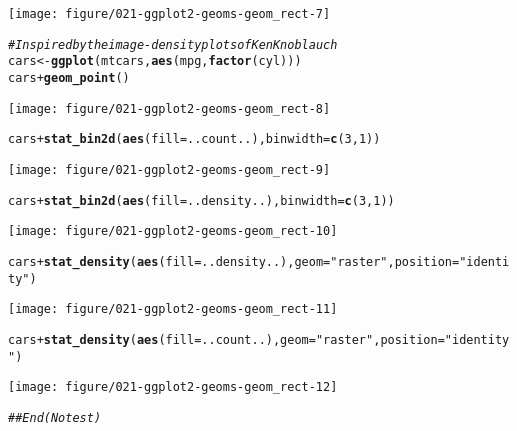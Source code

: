 \documentclass[a4paper,titlepage]{tufte-handout}\usepackage[]{graphicx}\usepackage[]{color}
\makeatletter
\def\maxwidth{ %
  \ifdim\Gin@nat@width>\linewidth
    \linewidth
  \else
    \Gin@nat@width
  \fi
}
\newcommand{\hlnum}[1]{\textcolor[rgb]{0.686,0.059,0.569}{#1}}%
\newcommand{\hlstr}[1]{\textcolor[rgb]{0.192,0.494,0.8}{#1}}%
\newcommand{\hlcom}[1]{\textcolor[rgb]{0.678,0.584,0.686}{\textit{#1}}}%
\newcommand{\hlopt}[1]{\textcolor[rgb]{0,0,0}{#1}}%
\newcommand{\hlstd}[1]{\textcolor[rgb]{0.345,0.345,0.345}{#1}}%
\newcommand{\hlkwb}[1]{\textcolor[rgb]{0.69,0.353,0.396}{#1}}%
\newcommand{\hlkwc}[1]{\textcolor[rgb]{0.333,0.667,0.333}{#1}}%
\newcommand{\hlkwd}[1]{\textcolor[rgb]{0.737,0.353,0.396}{\textbf{#1}}}%
\newenvironment{kframe}{%
 \def\at@end@of@kframe{}%
 \ifinner\ifhmode%
  \def\at@end@of@kframe{\end{minipage}}%
  \begin{minipage}{\columnwidth}%
 \fi\fi%
 \def\FrameCommand##1{\hskip\@totalleftmargin \hskip-\fboxsep
 \colorbox{shadecolor}{##1}\hskip-\fboxsep
     \hskip-\linewidth \hskip-\@totalleftmargin \hskip\columnwidth}%
 \MakeFramed {\advance\hsize-\width
   \@totalleftmargin\z@ \linewidth\hsize
   \@setminipage}}%
 {\par\unskip\endMakeFramed%
 \at@end@of@kframe}
\newenvironment{knitrout}{}{} %
\makeatother
\begin{document}
\begin{knitrout}
\begin{kframe}
\begin{alltt}
\end{alltt}
\end{kframe}
\texttt{[image: figure/021-ggplot2-geoms-geom\_rect-7]} 
\begin{kframe}\begin{alltt}
\hlcom{# Inspired by the image-density plots of Ken Knoblauch}
\hlstd{cars} \hlkwb{<-} \hlkwd{ggplot}\hlstd{(mtcars,} \hlkwd{aes}\hlstd{(mpg,} \hlkwd{factor}\hlstd{(cyl)))}
\hlstd{cars} \hlopt{+} \hlkwd{geom_point}\hlstd{()}
\end{alltt}
\end{kframe}
\texttt{[image: figure/021-ggplot2-geoms-geom\_rect-8]} 
\begin{kframe}\begin{alltt}
\hlstd{cars} \hlopt{+} \hlkwd{stat_bin2d}\hlstd{(}\hlkwd{aes}\hlstd{(}\hlkwc{fill} \hlstd{= ..count..),} \hlkwc{binwidth} \hlstd{=} \hlkwd{c}\hlstd{(}\hlnum{3}\hlstd{,}\hlnum{1}\hlstd{))}
\end{alltt}
\end{kframe}
\texttt{[image: figure/021-ggplot2-geoms-geom\_rect-9]} 
\begin{kframe}\begin{alltt}
\hlstd{cars} \hlopt{+} \hlkwd{stat_bin2d}\hlstd{(}\hlkwd{aes}\hlstd{(}\hlkwc{fill} \hlstd{= ..density..),} \hlkwc{binwidth} \hlstd{=} \hlkwd{c}\hlstd{(}\hlnum{3}\hlstd{,}\hlnum{1}\hlstd{))}
\end{alltt}
\end{kframe}
\texttt{[image: figure/021-ggplot2-geoms-geom\_rect-10]} 
\begin{kframe}\begin{alltt}
\hlstd{cars} \hlopt{+} \hlkwd{stat_density}\hlstd{(}\hlkwd{aes}\hlstd{(}\hlkwc{fill} \hlstd{= ..density..),} \hlkwc{geom} \hlstd{=} \hlstr{"raster"}\hlstd{,} \hlkwc{position} \hlstd{=} \hlstr{"identity"}\hlstd{)}
\end{alltt}
\end{kframe}
\texttt{[image: figure/021-ggplot2-geoms-geom\_rect-11]} 
\begin{kframe}\begin{alltt}
\hlstd{cars} \hlopt{+} \hlkwd{stat_density}\hlstd{(}\hlkwd{aes}\hlstd{(}\hlkwc{fill} \hlstd{= ..count..),} \hlkwc{geom} \hlstd{=} \hlstr{"raster"}\hlstd{,} \hlkwc{position} \hlstd{=} \hlstr{"identity"}\hlstd{)}
\end{alltt}
\end{kframe}
\texttt{[image: figure/021-ggplot2-geoms-geom\_rect-12]} 
\begin{kframe}\begin{alltt}
\hlcom{## End(No test)}
\end{alltt}
\end{kframe}
\end{knitrout}
\end{document}
